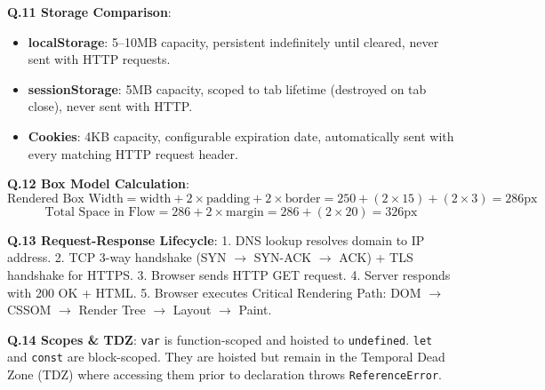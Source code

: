 \begin{solutionbox}
\textbf{Q.11 Storage Comparison}:
\begin{itemize}[leftmargin=*]
  \item \textbf{localStorage}: 5--10MB capacity, persistent indefinitely until cleared, never sent with HTTP requests.
  \item \textbf{sessionStorage}: 5MB capacity, scoped to tab lifetime (destroyed on tab close), never sent with HTTP.
  \item \textbf{Cookies}: 4KB capacity, configurable expiration date, automatically sent with every matching HTTP request header.
\end{itemize}

\textbf{Q.12 Box Model Calculation}:
$$\text{Rendered Box Width} = \text{width} + 2 \times \text{padding} + 2 \times \text{border} = 250 + (2 \times 15) + (2 \times 3) = 286\text{px}$$
$$\text{Total Space in Flow} = 286 + 2 \times \text{margin} = 286 + (2 \times 20) = 326\text{px}$$

\textbf{Q.13 Request-Response Lifecycle}:
1. DNS lookup resolves domain to IP address. 2. TCP 3-way handshake (SYN $\to$ SYN-ACK $\to$ ACK) + TLS handshake for HTTPS. 3. Browser sends HTTP GET request. 4. Server responds with 200 OK + HTML. 5. Browser executes Critical Rendering Path: DOM $\to$ CSSOM $\to$ Render Tree $\to$ Layout $\to$ Paint.

\textbf{Q.14 Scopes \& TDZ}:
\texttt{var} is function-scoped and hoisted to \texttt{undefined}. \texttt{let} and \texttt{const} are block-scoped. They are hoisted but remain in the Temporal Dead Zone (TDZ) where accessing them prior to declaration throws \texttt{ReferenceError}.
\end{solutionbox}

